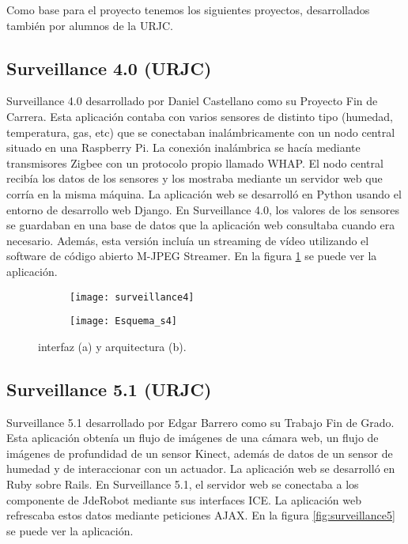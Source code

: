 Como base para el proyecto tenemos los siguientes proyectos, desarrollados también por alumnos de la URJC.\\

\subsection{Surveillance 4.0 (URJC)}

Surveillance 4.0 desarrollado por Daniel Castellano como su Proyecto Fin de Carrera. Esta aplicación contaba con varios sensores de distinto tipo (humedad, temperatura, gas, etc) que se conectaban inalámbricamente con un nodo central situado en una Raspberry Pi. La conexión inalámbrica se hacía mediante transmisores Zigbee con un protocolo propio llamado WHAP. El nodo central recibía los datos de los sensores y los mostraba mediante un servidor web que corría en la misma máquina. La aplicación web se desarrolló en Python usando el entorno de desarrollo web Django. En Surveillance 4.0, los valores de los sensores se guardaban en una base de datos que la aplicación web consultaba cuando era necesario. Además, esta versión incluía un streaming de vídeo utilizando el software de código abierto M-JPEG Streamer. En la figura \ref{fig:surveillance4} se puede ver la aplicación.\\

\begin{figure}[h]
\centering
  \begin{subfigure}[]{110mm}
    \texttt{[image: surveillance4]}
  \end{subfigure}
  \hspace{5pt}
  \begin{subfigure}[]{110mm}
    \texttt{[image: Esquema\_s4]}
  \end{subfigure}
  \caption{interfaz (a) y arquitectura (b).}\label{fig:surveillance4}
\end{figure}



\subsection{Surveillance 5.1 (URJC)}

Surveillance 5.1 desarrollado por Edgar Barrero como su Trabajo Fin de Grado. Esta aplicación obtenía un flujo de imágenes de una cámara web, un flujo de imágenes de profundidad de un sensor Kinect, además de datos de un sensor de humedad y de interaccionar con un actuador. La aplicación web se desarrolló en Ruby sobre Rails. En Surveillance 5.1, el servidor web se conectaba a los componente de JdeRobot mediante sus interfaces ICE. La aplicación web refrescaba estos datos mediante peticiones AJAX.  En la figura \ref{fig:surveillance5} se puede ver la aplicación.\\


